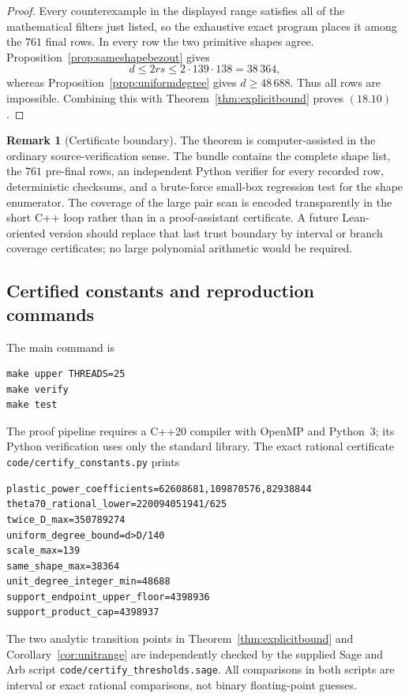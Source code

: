 \documentclass[11pt]{article}
\theoremstyle{definition}
\newtheorem{remark}[theorem]{Remark}
\begin{document}
\begin{proof}
Every counterexample in the displayed range satisfies all of the
mathematical filters just listed, so the exhaustive exact program places it
among the \(761\) final rows.  In every row the two primitive shapes agree.
Proposition~\ref{prop:sameshapebezout} gives
\[
 d\leq2rs\leq2\cdot139\cdot138=38\,364,
\]
whereas Proposition~\ref{prop:uniformdegree} gives \(d\geq48\,688\).  Thus
all rows are impossible.  Combining this with
Theorem~\ref{thm:explicitbound} proves \((18.10)\).
\end{proof}

\begin{remark}[Certificate boundary]
The theorem is computer-assisted in the ordinary source-verification sense.
The bundle contains the complete shape list, the \(761\) pre-final rows, an
independent Python verifier for every recorded row, deterministic checksums,
and a brute-force small-box regression test for the shape enumerator.  The
coverage of the large pair scan is encoded transparently in the short C++
loop rather than in a proof-assistant certificate.  A future Lean-oriented
version should replace that last trust boundary by interval or branch
coverage certificates; no large polynomial arithmetic would be required.
\end{remark}

\subsection{Certified constants and reproduction commands}

The main command is
\begin{lstlisting}[basicstyle=\ttfamily\footnotesize]
make upper THREADS=25
make verify
make test
\end{lstlisting}
The proof pipeline requires a C++20 compiler with OpenMP and Python~3; its
Python verification uses only the standard library.  The exact rational
certificate \texttt{code/certify\_constants.py} prints
\begin{lstlisting}[basicstyle=\ttfamily\scriptsize]
plastic_power_coefficients=62608681,109870576,82938844
theta70_rational_lower=220094051941/625
twice_D_max=350789274
uniform_degree_bound=d>D/140
scale_max=139
same_shape_max=38364
unit_degree_integer_min=48688
support_endpoint_upper_floor=4398936
support_product_cap=4398937
\end{lstlisting}
The two analytic transition points in Theorem~\ref{thm:explicitbound} and
Corollary~\ref{cor:unitrange} are independently checked by the supplied Sage
and Arb script \texttt{code/certify\_thresholds.sage}.  All comparisons in
both scripts are interval or exact rational comparisons, not binary
floating-point guesses.
\end{document}
